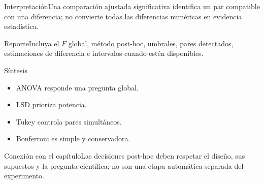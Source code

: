 \documentclass[10pt,aspectratio=169]{beamer}
\begin{document}
\begin{frame}{Interpretación}\small Una comparación ajustada significativa identifica un par compatible con una diferencia; no convierte todas las diferencias numéricas en evidencia estadística.\end{frame}
\begin{frame}{Reporte}\small Incluya el $F$ global, método post-hoc, umbrales, pares detectados, estimaciones de diferencia e intervalos cuando estén disponibles.\end{frame}
\begin{frame}{Síntesis}\small\begin{itemize}\item ANOVA responde una pregunta global.\item LSD prioriza potencia.\item Tukey controla pares simultáneos.\item Bonferroni es simple y conservadora.\end{itemize}\end{frame}
\begin{frame}{Conexión con el capítulo}\small Las decisiones post-hoc deben respetar el diseño, sus supuestos y la pregunta científica; no son una etapa automática separada del experimento.\end{frame}
\end{document}
